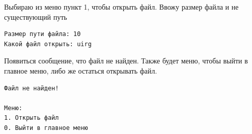 Выбираю из меню пункт 1, чтобы открыть файл. Ввожу размер файла и не существующий путь

\begin{tcolorbox}
\begin{verbatim}
Размер пути файла: 10
Какой файл открыть: uirg
\end{verbatim}
\end{tcolorbox}

Появиться сообщение, что файл не найден. Также будет меню, чтобы выйти в главное меню, либо же остаться открывать файл.

\begin{tcolorbox}
\begin{verbatim}
Файл не найден!

Меню:
1. Открыть файл
0. Выйти в главное меню
\end{verbatim}
\end{tcolorbox}
